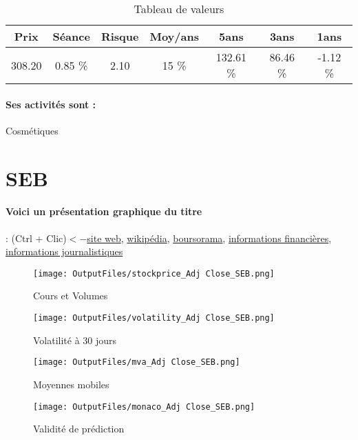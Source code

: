 \documentclass[11pt,a4paper]{report}%
\begin{document}
\begin{table}[H]
  \centering
    \begin{tabular}{|c|c|c|c|c|c|c|}
    \hline
    Prix & Séance & Risque  & Moy/ans & 5ans & 3ans & 1ans \\
    \hline
    308.20 &    0.85 \%    & 2.10 & 15 \% & 132.61 \% & 86.46 \% & -1.12 \% \\
    \hline
    \end{tabular}%
        \label{tab:table_LOREAL}%
      \caption{Tableau de valeurs}
\end{table}%

\paragraph{Ses activités sont : } Cosmétiques 
    
    \newpage

\section{SEB}

\paragraph{Voici un présentation graphique du titre} : (Ctrl + Clic)$<-$\href{https://www.groupeseb.com/fr/finance/espace-analystesinvestisseurs}{site web}, \href{https://fr.wikipedia.org/wiki/SEB}{wikipédia}, \href{https://www.boursorama.com/cours/1rPSK}{boursorama}, \href{https://www.qwant.com/?q=site:https:%2f%2fwww.easybourse.com%2faction-societe%2fSEB&t=web&client=ext-firefox-hp}{informations financières}, \href{https://bourse.lerevenu.com/cours-de-bourse/fiche-valeur-synthese/SEB/SK-FR}{informations journalistiques}
\begin{figure}[!htb]
   \begin{minipage}{0.5\textwidth}
     \centering
     \texttt{[image: OutputFiles/stockprice\_Adj Close\_SEB.png]}
     \caption{Cours et Volumes}\label{Fig:price_SEB}
   \end{minipage}\hfill
   \begin{minipage}{0.5\textwidth}
     \centering
     \texttt{[image: OutputFiles/volatility\_Adj Close\_SEB.png]}
     \caption{Volatilité à 30 jours}\label{Fig:volat_SEB}
   \end{minipage}
\end{figure}
\begin{figure}[!htb]
   \begin{minipage}{0.5\textwidth}
     \centering
     \texttt{[image: OutputFiles/mva\_Adj Close\_SEB.png]}
     \caption{Moyennes mobiles}\label{Fig:mva_SEB}
   \end{minipage}\hfill
   \begin{minipage}{0.5\textwidth}
     \centering
     \texttt{[image: OutputFiles/monaco\_Adj Close\_SEB.png]}
     \caption{Validité de prédiction}\label{Fig:prediction_SEB}
   \end{minipage}
\end{figure}
\end{document}
